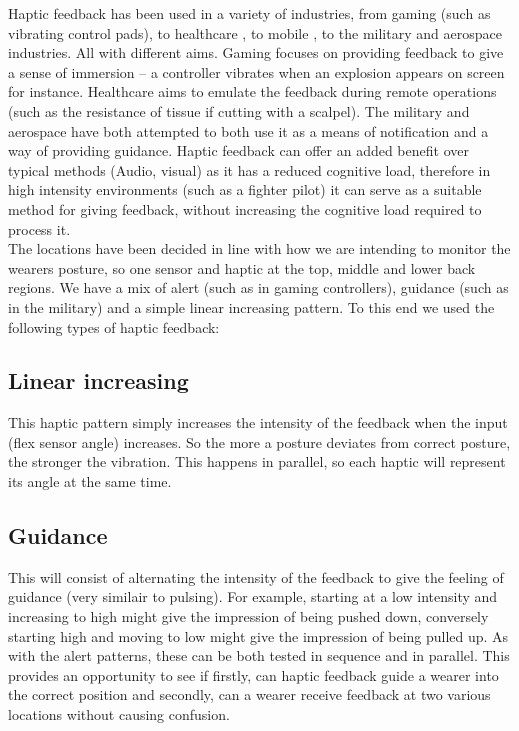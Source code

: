 \documentclass[sigconf]{acmart}
\begin{document}
Haptic feedback has been used in a variety of industries, from gaming (such as vibrating control pads), to healthcare \cite{bethea2004application}, to mobile \cite{cuartielles2012mobile}, to the military and aerospace industries.  All with different aims. Gaming focuses on providing feedback to give a sense of immersion – a controller vibrates when an explosion appears on screen for instance. Healthcare aims to emulate the feedback during remote operations (such as the resistance of tissue if cutting with a scalpel). The military \cite{immonen2008haptics} and aerospace have both attempted to both use it as a means of notification and a way of providing guidance. Haptic feedback can offer an added benefit over typical methods (Audio, visual) as it has a reduced cognitive load, therefore in high intensity environments (such as a fighter pilot) it can serve as a suitable method for giving feedback, without increasing the cognitive load required to process it.\\

The locations have been decided in line with how we are intending to monitor the wearer\textquotesingle s posture, so one sensor and haptic at the top, middle and lower back regions.
We have a mix of alert (such as in gaming controllers), guidance (such as in the military) and a simple linear increasing pattern. To this end we used the following types of haptic feedback:

\subsection{Linear increasing}
This haptic pattern simply increases the intensity of the feedback when the input (flex sensor angle) increases. So the more a posture deviates from correct posture, the stronger the vibration. This happens in parallel, so each haptic will represent its angle at the same time.

\subsection{Guidance}
This will consist of alternating the intensity of the feedback to give the feeling of guidance (very similair to pulsing). For example, starting at a low intensity and increasing to high might give the impression of being \textquotesingle pushed \textquotesingle down, conversely starting high and moving to low might give the impression of being \textquotesingle pulled \textquotesingle up. As with the alert patterns, these can be both tested in sequence and in parallel. This provides an opportunity to see if firstly, can haptic feedback guide a wearer into the correct position and secondly, can a wearer receive feedback at two various locations without causing confusion.\\
\end{document}
